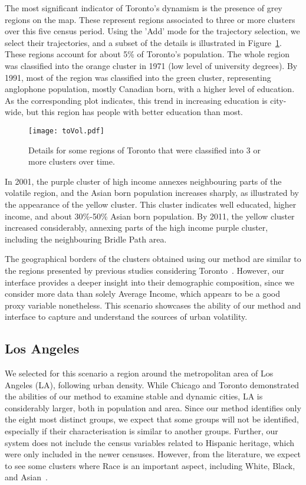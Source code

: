The most significant indicator of Toronto's dynamism is the presence of grey
regions on the map. These represent regions associated to three or more clusters
over this five census period. Using the 'Add' mode for the trajectory selection,
we select their trajectories, and a subset of the details is illustrated in
Figure~\ref{fig:toVol}. These regions account for about 5\% of Toronto's
population. The whole region was classified into the orange cluster in 1971 (low
level of university degrees). By 1991, most of the region was classified into
the green cluster, representing anglophone population, mostly Canadian born,
with a higher level of education. As the corresponding plot indicates, this
trend in increasing education is city-wide, but this region has people with
better education than most.

\begin{figure}
    \centering 
    \texttt{[image: toVol.pdf]}
    \caption{Details for some regions of Toronto that were classified into 3 or
         more clusters over time.\label{fig:toVol}}
\end{figure}

In 2001, the purple cluster of high income annexes neighbouring parts of the
volatile region, and the Asian born population increases sharply, as illustrated
by the appearance of the yellow cluster.  This cluster indicates well educated,
higher income, and about 30\%-50\% Asian born population. By 2011, the yellow
cluster increased considerably, annexing parts of the high income purple
cluster, including the neighbouring Bridle Path area.

The geographical borders of the clusters obtained using our method are similar
to the regions presented by previous studies considering
Toronto~\citep{hulchanski2007three}. However, our interface provides a deeper insight
into their demographic composition, since we consider more data than solely
Average Income, which appears to be a good proxy variable nonetheless. This
scenario showcases the ability of our method and interface to capture and
understand the sources of urban volatility.

\subsection{Los Angeles}

We selected for this scenario a region around the metropolitan area of Los
Angeles (LA), following urban density. While Chicago and Toronto demonstrated
the abilities of our method to examine stable and dynamic cities, LA is considerably
larger, both in population and area. Since our method identifies only the eight
most distinct groups, we expect that some groups will not be identified,
especially if their characterisation is similar to another groups. Further, our
system does not include the census variables related to Hispanic heritage, which
were only included in the newer censuses. However, from the literature, we
expect to see some clusters where Race is an important aspect, including White,
Black, and Asian~\citep{Reibel2003}.




